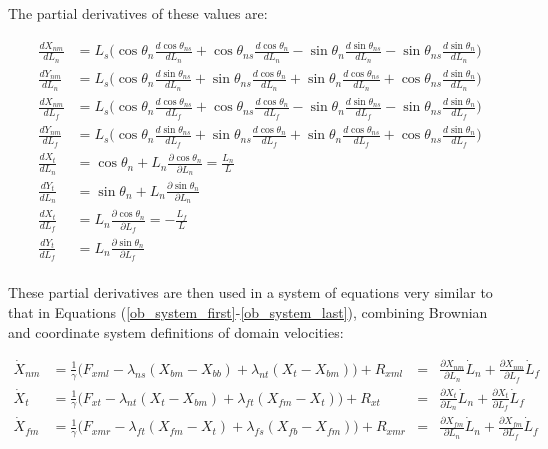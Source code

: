 \documentclass[10pt]{article} %
\begin{document}
The partial derivatives of these values are:

\begin{align}
  \frac{dX_{nm}}{dL_n} &= L_s\Big(\cos\theta_n\frac{d\cos\theta_{ns}}{dL_n} + \cos\theta_{ns}\frac{d\cos\theta_{n}}{dL_n} - \sin\theta_n\frac{d\sin\theta_{ns}}{dL_n} - \sin\theta_{ns}\frac{d\sin\theta_{n}}{dL_n}\Big)\\
  \frac{dY_{nm}}{dL_n} &= L_s\Big(\cos\theta_n\frac{d\sin\theta_{ns}}{dL_n} + \sin\theta_{ns}\frac{d\cos\theta_{n}}{dL_n} + \sin\theta_n\frac{d\cos\theta_{ns}}{dL_n} + \cos\theta_{ns}\frac{d\sin\theta_{n}}{dL_n} \Big)\\
  \frac{dX_{nm}}{dL_f} &= L_s\Big(\cos\theta_n\frac{d\cos\theta_{ns}}{dL_f} + \cos\theta_{ns}\frac{d\cos\theta_{n}}{dL_f} - \sin\theta_n\frac{d\sin\theta_{ns}}{dL_f} - \sin\theta_{ns}\frac{d\sin\theta_{n}}{dL_f} \Big)\\
  \frac{dY_{nm}}{dL_f} &= L_s\Big(\cos\theta_n\frac{d\sin\theta_{ns}}{dL_f} + \sin\theta_{ns}\frac{d\cos\theta_{n}}{dL_f} + \sin\theta_n\frac{d\cos\theta_{ns}}{dL_f} + \cos\theta_{ns}\frac{d\sin\theta_{n}}{dL_f}\Big)\\
  \frac{dX_{t}}{dL_n} &= \cos\theta_n + L_n\frac{\partial \cos\theta_n}{\partial L_n} = \frac{L_n}{L}\\
  \frac{dY_{t}}{dL_n} &= \sin\theta_n + L_n\frac{\partial \sin\theta_n}{\partial L_n}\\
  \frac{dX_{t}}{dL_f} &= L_n\frac{\partial \cos\theta_n}{\partial L_f} = -\frac{L_f}{L}\\
  \frac{dY_{t}}{dL_f} &= L_n\frac{\partial \sin\theta_n}{\partial L_f}\\
\end{align}

These partial derivatives are then used in a system of equations very similar to that in Equations (\ref{ob_system_first}-\ref{ob_system_last}), combining Brownian and coordinate system definitions of domain velocities:

\begin{align}
  \dot{X}_{nm} &= \frac{1}{\gamma} \Big(F_{xml} - \lambda_{ns}(X_{bm} - X_{bb})
  + \lambda_{nt}(X_{t } - X_{bm}) \Big) + R_{xml}
  &=& \frac{\partial X_{nm}}{\partial L_n}\dot{L}_n + \frac{\partial X_{nm}}{\partial L_f}\dot{L}_f\\
  \dot{X}_{t } &= \frac{1}{\gamma} \Big(F_{xt } - \lambda_{nt}(X_{t } - X_{bm})
  + \lambda_{ft}(X_{fm} - X_{t }) \Big) + R_{xt }
  &=& \frac{\partial X_{t}}{\partial L_n}\dot{L}_n + \frac{\partial X_{t}}{\partial L_f}\dot{L}_f\\
  \dot{X}_{fm} &= \frac{1}{\gamma} \Big(F_{xmr} - \lambda_{ft}(X_{fm} - X_{t })
  + \lambda_{fs}(X_{fb} - X_{fm}) \Big) + R_{xmr}
  &=& \frac{\partial X_{fm}}{\partial L_n}\dot{L}_n + \frac{\partial X_{fm}}{\partial L_f}\dot{L}_f
\end{align}
\end{document}
